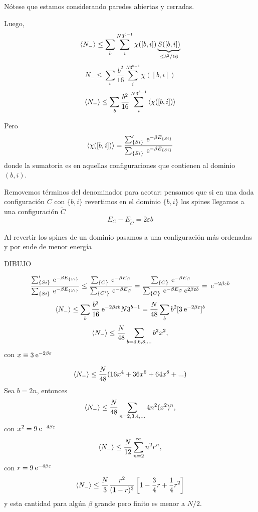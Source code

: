 \documentclass[10pt,oneside]{CBFT_book}
\begin{document}
Nótese que estamos considerando paredes abiertas y cerradas.

Luego,
\[
	\braket{N_-} \leq \sum_b \sum_i^{N3^{b-1}} \chi([b,i]) \underbrace{S([b,i])}_{\leq b^2/16}
\]
\[
	N_- \leq \sum_b \frac{b^2}{16} \sum_i^{N3^{b-1}} \chi([b,i])
\]
\[
	\braket{N_-} \leq \sum_b \frac{b^2}{16} \sum_i^{N3^{b-1}} \braket{\chi([b,i])}
\]

Pero
\[
	\braket{\chi([b,i])} = \frac{ \sum_{\{Si\}}' \:\mathrm{e}^{-\beta E_{\{Si\}}} }
	{ \sum_{\{Si\}} \:\mathrm{e}^{-\beta E_{\{Si\}}} }
\]
donde la sumatoria es en aquellas configuraciones que contienen al dominio $(b,i)$.


Removemos términos del denominador para acotar: pensamos que si en una dada configuración $C$ con $\{b,i\}$ revertimos 
en el dominio $\{b,i\}$ los spines llegamos a una configuración $\tilde{C}$
\[
	E_C - E_{\tilde{C}} = 2 \varepsilon b
\]

Al revertir los spines de un dominio pasamos a una configuración más ordenadas y por ende de menor energía
 
 DIBUJO
 
\[
	\frac{ \sum_{\{Si\}}' \:\mathrm{e}^{-\beta E_{\{Si\}}} }{ \sum_{\{Si\}} \:\mathrm{e}^{-\beta E_{\{Si\}}} }
	\leq 
	\frac{ \sum_{\{C\}} \:\mathrm{e}^{-\beta E_C} }{ \sum_{\{C'\}} \:\mathrm{e}^{-\beta E_{\tilde{C}}} } =
	\frac{ \sum_{\{C\}} \:\mathrm{e}^{-\beta E_C} }{ \sum_{\{C\}} \:\mathrm{e}^{-\beta E_{\tilde{C}}} 
	\:\mathrm{e}^{2\beta\varepsilon b} } = \:\mathrm{e}^{-2\beta \varepsilon b}
\] 
\[
	\braket{N_-} \leq \sum_b \frac{b^2}{16} \:\mathrm{e}^{-2\beta \varepsilon b} N 3^{b-1} =
	\frac{N}{48} \sum_b b^2 [ 3 \:\mathrm{e}^{-2\beta \varepsilon } ]^b
\]
\[
	\braket{N_-} \leq \frac{N}{48} \sum_{b=4,6,8,...} b^2 x^2,
\]
con $ x \equiv 3 \:\mathrm{e}^{-2\beta \varepsilon } $

\[
	\braket{N_-} \leq \frac{N}{48} (16x^4 + 36x^6 + 64x^8 + ...) 
\]
Sea $b=2n$, entonces
\[
	\braket{N_-} \leq \frac{N}{48} \sum_{n=2,3,4,...} 4 n^2 (x^2)^n,
\]
con $x^2 = 9 \:\mathrm{e}^{-4\beta\varepsilon} $
\[
	\braket{N_-} \leq \frac{N}{12} \sum_{n=2}^\infty n^2 r^n,
\]
con $r=9 \:\mathrm{e}^{-4\beta\varepsilon}$
\[
	\braket{N_-} \leq \frac{N}{3} \frac{r^2}{(1-r)^3} \left[ 1 - \frac{3}{4}r + \frac{1}{4}r^2 \right]
\]
y esta cantidad para algún $\beta$ grande pero finito es menor a $N/2$.


\end{document}

